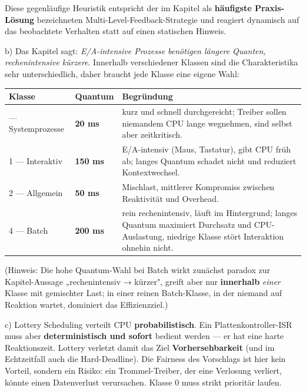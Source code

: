 \documentclass[11pt, a4paper]{article}
\begin{document}
Diese gegenläufige Heuristik entspricht der im Kapitel als \textbf{häufigste Praxis-Lösung} bezeichneten Multi-Level-Feedback-Strategie und reagiert dynamisch auf das beobachtete Verhalten statt auf einen statischen Hinweis.


b) Das Kapitel sagt: \textit{E/A-intensive Prozesse benötigen längere Quanten, rechenintensive kürzere}. Innerhalb verschiedener Klassen sind die Charakteristika sehr unterschiedlich, daher braucht jede Klasse eine eigene Wahl:



{\small
\begin{tabularx}{\linewidth}{XXX}
\hline
\rowcolor{tableheadbg}
{\color{white}\textbf{Klasse}} & {\color{white}\textbf{Quantum}} & {\color{white}\textbf{Begründung}} \\[2pt]
\hline
\endhead
\hline
\endfoot
0 — Systemprozesse & \textbf{20 ms} & kurz und schnell durchgereicht; Treiber sollen niemandem CPU lange wegnehmen, sind selbst aber zeitkritisch. \\
1 — Interaktiv & \textbf{150 ms} & E/A-intensiv (Maus, Tastatur), gibt CPU früh ab; langes Quantum schadet nicht und reduziert Kontextwechsel. \\
2 — Allgemein & \textbf{50 ms} & Mischlast, mittlerer Kompromiss zwischen Reaktivität und Overhead. \\
4 — Batch & \textbf{200 ms} & rein rechenintensiv, läuft im Hintergrund; langes Quantum maximiert Durchsatz und CPU-Auslastung, niedrige Klasse stört Interaktion ohnehin nicht. \\
\end{tabularx}
}


(Hinweis: Die hohe Quantum-Wahl bei Batch wirkt zunächst paradox zur Kapitel-Aussage „rechenintensiv → kürzer", greift aber nur \textbf{innerhalb} \textit{einer} Klasse mit gemischter Last; in einer reinen Batch-Klasse, in der niemand auf Reaktion wartet, dominiert das Effizienzziel.)


c) Lottery Scheduling verteilt CPU \textbf{probabilistisch}. Ein Plattenkontroller-ISR muss aber \textbf{deterministisch und sofort} bedient werden — er hat eine harte Reaktionszeit. Lottery verletzt damit das Ziel \textbf{Vorhersehbarkeit} (und im Echtzeitfall auch die Hard-Deadline). Die Fairness des Vorschlags ist hier kein Vorteil, sondern ein Risiko: ein Trommel-Treiber, der eine Verlosung verliert, könnte einen Datenverlust verursachen. Klasse 0 muss strikt prioritär laufen.
\end{document}
